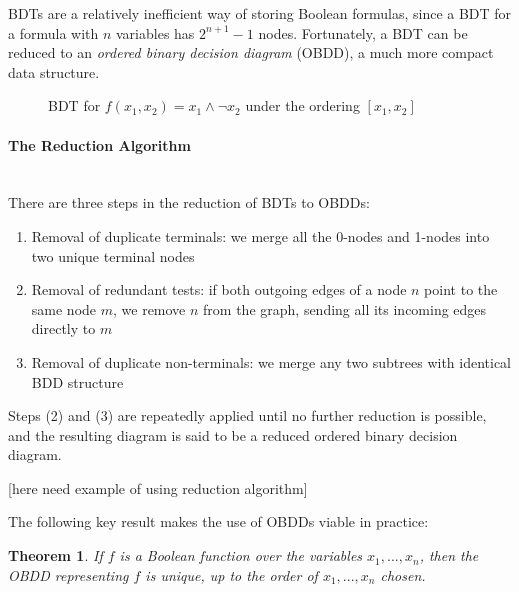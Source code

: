 \documentclass[11pt]{article}
\newtheorem{theorem}{Theorem}[section]
\newcommand{\myparagraph}[1]{\paragraph{#1}\mbox{}\\}
\begin{document}
BDTs are a relatively inefficient way of storing Boolean formulas, since a BDT for a formula with $n$ variables has $2^{n+1} - 1$ nodes. Fortunately, a BDT can be reduced to an \textit{ordered binary decision diagram} (OBDD), a much more compact data structure.

\begin{figure}
\centering
{}
	\caption{BDT for $f(x_1, x_2) = x_1 \land \lnot x_2$ under the ordering $[x_1, x_2]$}
\label{fig:BDT}
\end{figure}

\myparagraph{The Reduction Algorithm} 

\noindent There are three steps in the reduction of BDTs to OBDDs:
\begin{enumerate}
\item Removal of duplicate terminals: we merge all the 0-nodes and 1-nodes into two unique terminal nodes
\item Removal of redundant tests: if both outgoing edges of a node $n$ point to the same node $m$, we remove $n$ from the graph, sending all its incoming edges directly to $m$ 
\item Removal of duplicate non-terminals: we merge any two subtrees with identical BDD structure
\end{enumerate}
Steps (2) and (3) are repeatedly applied until no further reduction is possible, and the resulting diagram is said to be a reduced ordered binary decision diagram. 

[here need example of using reduction algorithm]

The following key result makes the use of OBDDs viable in practice: 

\begin{theorem} \cite{bryant}
\label{obdd_uniqueness}
If $f$ is a Boolean function over the variables $x_1, ..., x_n$, then the OBDD representing $f$ is unique, up to the order of $x_1, ..., x_n$ chosen.
\end{theorem}
\end{document}
